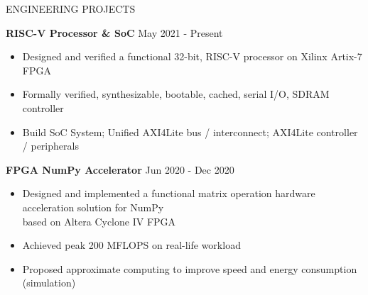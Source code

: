 \documentclass{resume} %
\begin{document}
  \begin{rSection}{ENGINEERING PROJECTS}

    \textbf{RISC-V Processor \& SoC}        \hfill May 2021 - Present\\
    \LineShrinkBeforeItem
    \begin{itemize} [leftmargin=1em]
      \itemsep -0.6em
      \item Designed and verified a functional 32-bit, RISC-V processor on Xilinx Artix-7 FPGA
      \item Formally verified, synthesizable, bootable, cached, serial I/O, SDRAM controller
      \item Build SoC System; Unified AXI4Lite bus / interconnect; AXI4Lite controller / peripherals
    \end{itemize}


    \textbf{FPGA NumPy Accelerator}         \hfill Jun 2020 - Dec 2020\\
    \LineShrinkBeforeItem
    \begin{itemize} [leftmargin=1em]
      \itemsep -0.6em
      \item Designed and implemented a functional matrix operation hardware acceleration solution for NumPy \\ based on Altera Cyclone IV FPGA
      \item Achieved peak 200 MFLOPS on real-life workload
      \item Proposed approximate computing to improve speed and energy consumption (simulation)
    \end{itemize}

  \end{rSection}

\end{document}
